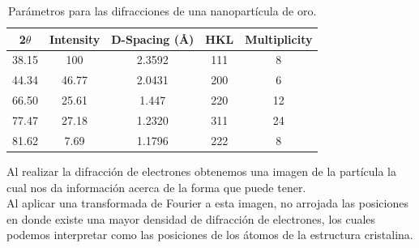 \documentclass[reprint,amsmath,amssymb,aps,]{revtex4-2}
\begin{document}
\begin{table}[H]
    \centering
    \begin{tabular}{ccccc}\hline
        2$\theta$ & Intensity & D-Spacing (\r{A}) & HKL & Multiplicity\\ \hline
        38.15 & 100 & 2.3592 & 111 & 8 \\
        44.34 & 46.77 & 2.0431 & 200 & 6 \\
        66.50 & 25.61 & 1.447 & 220 & 12 \\
        77.47 & 27.18 & 1.2320 & 311 & 24 \\
        81.62 & 7.69 & 1.1796 & 222 & 8 \\ \hline
    \end{tabular}
    \caption{Parámetros para las difracciones de una nanopartícula de oro.}
    \label{tabla:parametros}
\end{table}
Al realizar la difracción de electrones obtenemos una imagen de la partícula la cual nos da información acerca de la forma que puede tener. \\
Al aplicar una transformada de Fourier a esta imagen, no arrojada las posiciones en donde existe una mayor densidad de difracción de electrones, los cuales podemos interpretar como las posiciones de los átomos
de la estructura cristalina.
\end{document}
